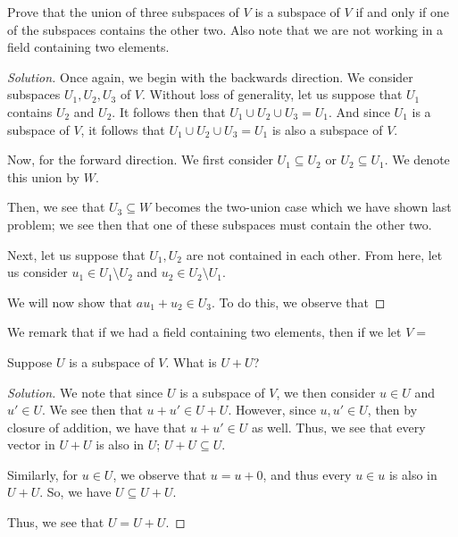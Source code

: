 \documentclass[openany]{book}
\newenvironment{solution}{\begin{proof}[Solution]}{\end{proof}}
\begin{document}
	\begin{hw}
		Prove that the union of three subspaces of $V$ is a subspace of $V$ if and only if one of the subspaces contains the other two. Also note that we are not working in a field containing two elements.
	\end{hw}
	\begin{solution}
		Once again, we begin with the backwards direction. We consider subspaces $U_{1}, U_{2}, U_{3}$ of $V$. Without loss of generality, let us suppose that $U_{1}$ contains $U_{2}$ and $U_{2}$. It follows then that $U_{1} \cup U_{2} \cup U_{3} = U_{1}$. And since $U_{1}$ is a subspace of $V$, it follows that $U_{1} \cup U_{2} \cup U_{3} = U_{1}$ is also a subspace of $V$.
		
		Now, for the forward direction. We first consider $U_{1}\subseteq U_{2}$ or $U_{2} \subseteq U_{1}$. We denote this union by $W$.
		
		Then, we see that $U_{3} \subseteq W$ becomes the two-union case which we have shown last problem; we see then that one of these subspaces must contain the other two.
		
		Next, let us suppose that $U_{1}, U_{2}$ are not contained in each other. From here, let us consider $u_{1} \in U_{1} \setminus U_{2}$ and $u_{2} \in U_{2} \setminus U_{1}$.
		
		We will now show that $au_{1} + u_{2} \in U_{3}$. To do this, we observe that 
	\end{solution}
	\begin{rmk}
		We remark that if we had a field containing two elements, then if we let $V = $
	\end{rmk}

	\begin{hw}
		Suppose $U$ is a subspace of $V$. What is $U + U$?
	\end{hw}
	\begin{solution}
		We note that since $U$ is a subspace of $V$, we then consider $u \in U$ and $u' \in U$. We see then that $u + u' \in U + U$. However, since $u, u' \in U$, then by closure of addition, we have that $u + u' \in U$ as well. Thus, we see that every vector in $U+U$ is also in $U$; $U + U \subseteq U$.
		
		Similarly, for $u \in U$, we observe that $u = u + 0$, and thus every $u \in u$ is also in $U+U$. So, we have $U \subseteq U+U$.
		
		Thus, we see that $U = U+U$.
	\end{solution}
\end{document}

